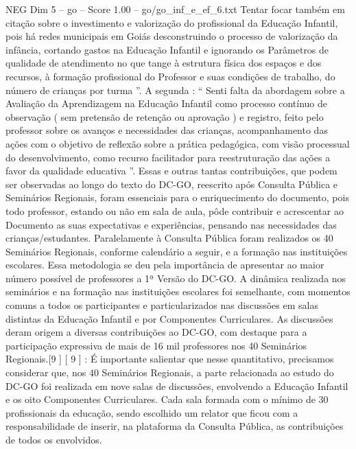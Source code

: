 \begin{textsample}{NEG Dim 5 – go – Score 1.00 – go/go\_inf\_e\_ef\_6.txt}
Tentar focar também em citação sobre o investimento e valorização do profissional da Educação Infantil, pois há redes municipais em Goiás desconstruindo o processo de valorização da infância, cortando gastos na Educação Infantil e ignorando os Parâmetros de qualidade de atendimento no que tange à estrutura física dos espaços e dos recursos, à formação profissional do Professor e suas condições de trabalho, do número de crianças por turma ”.
A segunda : “ Senti falta da abordagem sobre a Avaliação da Aprendizagem na Educação Infantil como processo contínuo de observação ( sem pretensão de retenção ou aprovação ) e registro, feito pelo professor sobre os avanços e necessidades das crianças, acompanhamento das ações com o objetivo de reflexão sobre a prática pedagógica, com visão processual do desenvolvimento, como recurso facilitador para reestruturação das ações a favor da qualidade educativa ”.
Essas e outras tantas contribuições, que podem ser observadas ao longo do texto do DC-GO, reescrito após Consulta Pública e Seminários Regionais, foram essenciais para o enriquecimento do documento, pois todo professor, estando ou não em sala de aula, pôde contribuir e acrescentar ao Documento as suas expectativas e experiências, pensando nas necessidades das crianças/estudantes.
Paralelamente à Consulta Pública foram realizados os 40 Seminários Regionais, conforme calendário a seguir, e a formação nas instituições escolares.
Essa metodologia se deu pela importância de apresentar ao maior número possível de professores a 1ª Versão do DC-GO.
A dinâmica realizada nos seminários e na formação nas instituições escolares foi semelhante, com momentos comuns a todos os participantes e particularizados nas discussões em salas distintas da Educação Infantil e por Componentes Curriculares.
As discussões deram origem a diversas contribuições ao DC-GO, com destaque para a participação expressiva de mais de 16 mil professores nos 40 Seminários Regionais.[9 ] [ 9 ] : É importante salientar que nesse quantitativo, precisamos considerar que, nos 40 Seminários Regionais, a parte relacionada ao estudo do DC-GO foi realizada em nove salas de discussões, envolvendo a Educação Infantil e os oito Componentes Curriculares.
Cada sala formada com o mínimo de 30 profissionais da educação, sendo escolhido um relator que ficou com a responsabilidade de inserir, na plataforma da Consulta Pública, as contribuições de todos os envolvidos.

\end{textsample}
